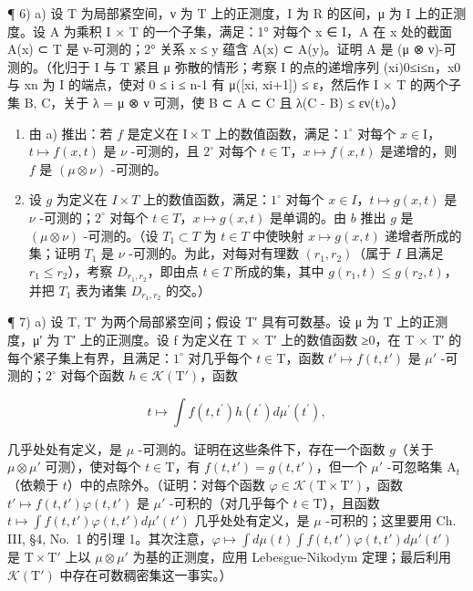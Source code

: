 ¶ 6) a) 设 T 为局部紧空间，ν 为 T 上的正测度，I 为 R 的区间，μ 为 I 上的正测度。设 A 为乘积 I × T 的一个子集，满足：1° 对每个 x ∈ I，A 在 x 处的截面 A(x) ⊂ T 是 ν-可测的；2° 关系 x ≤ y 蕴含 A(x) ⊂ A(y)。证明 A 是 (μ ⊗ ν)-可测的。（化归于 I 与 T 紧且 μ 弥散的情形；考察 I 的点的递增序列 (xi)0≤i≤n，x0 与 xn 为 I 的端点，使对 0 ≤ i ≤ n-1 有 μ({[}xi, xi+1{]}) ≤ ε，然后作 I × T 的两个子集 B, C，关于 λ = μ ⊗ ν 可测，使 B ⊂ A ⊂ C 且 λ(C - B) ≤ εν(t)。）

\begin{enumerate}
\def\labelenumi{\alph{enumi})}
\setcounter{enumi}{1}
\item
  由 a) 推出：若 \(f\) 是定义在 \(\mathrm{I} \times \mathrm{T}\) 上的数值函数，满足：\(1^{\circ}\) 对每个 \(x \in \mathrm{I}\)，\(t \mapsto f(x, t)\) 是 \(\nu\) -可测的，且 \(2^{\circ}\) 对每个 \(t \in \mathrm{T}\)，\(x \mapsto f(x, t)\) 是递增的，则 \(f\) 是 \((\mu \otimes \nu)\) -可测的。
\item
  设 \(g\) 为定义在 \(I \times T\) 上的数值函数，满足：\(1^{\circ}\) 对每个 \(x \in I\)，\(t \mapsto g(x, t)\) 是 \(\nu\) -可测的；\(2^{\circ}\) 对每个 \(t \in T\)，\(x \mapsto g(x, t)\) 是单调的。由 \(b\) 推出 \(g\) 是 \((\mu \otimes \nu)\) -可测的。（设 \(T_1 \subset T\) 为 \(t \in T\) 中使映射 \(x \mapsto g(x, t)\) 递增者所成的集；证明 \(T_1\) 是 \(\nu\) -可测的。为此，对每对有理数 \((r_1, r_2)\)（属于 \(I\) 且满足 \(r_1 \leqslant r_2\)），考察 \(D_{r_1, r_2}\)，即由点 \(t \in T\) 所成的集，其中 \(g(r_1, t) \leqslant g(r_2, t)\)，并把 \(T_1\) 表为诸集 \(D_{r_1, r_2}\) 的交。）
\end{enumerate}

¶ 7) a) 设 T, T′ 为两个局部紧空间；假设 T′ 具有可数基。设 μ 为 T 上的正测度，μ′ 为 T′ 上的正测度。设 f 为定义在 T × T′ 上的数值函数 ≥0，在 T × T′ 的每个紧子集上有界，且满足：\(1^{\circ}\) 对几乎每个 \(t \in \mathrm{T}\)，函数 \(t' \mapsto f(t, t')\) 是 \(\mu'\) -可测的；\(2^{\circ}\) 对每个函数 \(h \in \mathcal{K}(\mathrm{T}')\)，函数

\[
t \mapsto \int f (t, t ^ {\prime}) h (t ^ {\prime}) d \mu^ {\prime} (t ^ {\prime}),
\]

几乎处处有定义，是 \(\mu\) -可测的。证明在这些条件下，存在一个函数 \(g\)（关于 \(\mu \otimes \mu'\) 可测），使对每个 \(t \in \mathrm{T}\)，有 \(f(t, t') = g(t, t')\)，但一个 \(\mu'\) -可忽略集 \(\mathrm{A}_t\)（依赖于 \(t\)）中的点除外。（证明：对每个函数 \(\varphi \in \mathcal{K}(\mathrm{T} \times \mathrm{T}')\)，函数 \(t' \mapsto f(t, t')\varphi(t, t')\) 是 \(\mu'\) -可积的（对几乎每个 \(t \in \mathrm{T}\)），且函数 \(t \mapsto \int f(t, t')\varphi(t, t') d\mu'(t')\) 几乎处处有定义，是 \(\mu\) -可积的；这里要用 Ch. III, §4, No.~1 的引理 1。其次注意，\(\varphi \mapsto \int d\mu(t) \int f(t, t')\varphi(t, t') d\mu'(t')\) 是 \(\mathrm{T} \times \mathrm{T}'\) 上以 \(\mu \otimes \mu'\) 为基的正测度，应用 Lebesgue-Nikodym 定理；最后利用 \(\mathcal{K}(\mathrm{T}')\) 中存在可数稠密集这一事实。）

